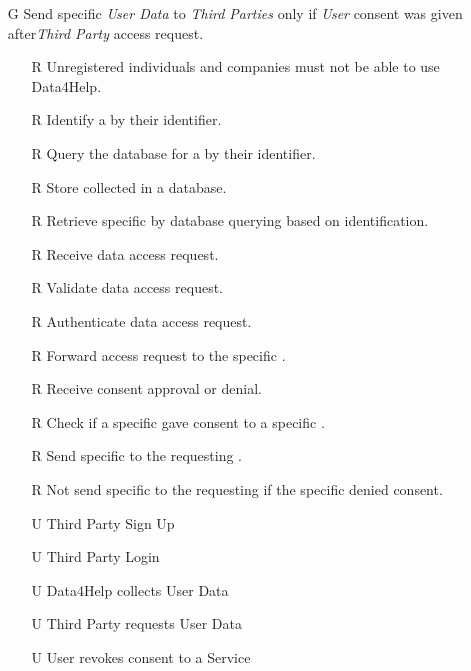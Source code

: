 \documentclass[../../../rasd.tex]{subfiles}
\begin{document}
\begin{itemize}
\begin{itemize}
    \end{itemize}

    \item[G\subs{2}]Send specific \textit{User Data} to \textit{Third Parties} only if \textit{User} consent was given after\textit{Third Party} access request.
    \begin{itemize}
        \item[R\subs{1}]Unregistered individuals and companies must not be able to use Data4Help.
        \item[R\subs{6}]Identify a  by their identifier.
        \item[R\subs{7}]Query the database for a  by their identifier.
        \item[R\subs{11}]Store collected  in a database.
        \item[R\subs{12}]Retrieve specific  by database querying based on  identification.
        \item[R\subs{13}]Receive  data access request.
        \item[R\subs{14}]Validate  data access request.
        \item[R\subs{15}]Authenticate  data access request.
        \item[R\subs{16}]Forward  access request to the specific .
        \item[R\subs{17}]Receive  consent approval or denial.
        \item[R\subs{18}]Check if a specific  gave consent to a specific .
        \item[R\subs{19}]Send specific to the requesting .
        \item[R\subs{20}]Not send specific to the requesting  if the specific  denied consent.
        \\
        \item[U\subs{2}]Third Party Sign Up
        \item[U\subs{4}]Third Party Login
        \item[U\subs{5}]Data4Help collects User Data
        \item[U\subs{6}]Third Party requests User Data
        \item[U\subs{11}]User revokes consent to a Service
    \end{itemize}


\end{itemize}
\end{document}

